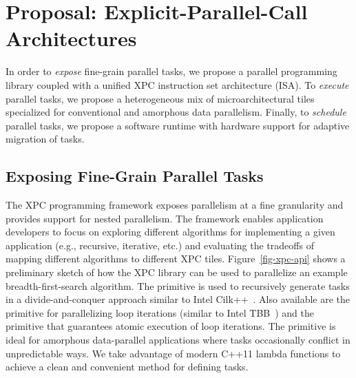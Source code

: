 
\section{Proposal: Explicit-Parallel-Call Architectures}
\label{sec-xpc}

In order to \emph{expose} fine-grain parallel tasks, we propose a
parallel programming library coupled with a unified XPC instruction set
architecture (ISA). To \emph{execute} parallel tasks, we propose a
heterogeneous mix of microarchitectural tiles specialized for
conventional and amorphous data parallelism. Finally, to \emph{schedule}
parallel tasks, we propose a software runtime with hardware support for
adaptive migration of tasks.

\subsection{Exposing Fine-Grain Parallel Tasks}


The XPC programming framework exposes parallelism at a fine granularity
and provides support for nested parallelism. The framework enables
application developers to focus on exploring different algorithms for
implementing a given application (e.g., recursive, iterative, etc.) and
evaluating the tradeoffs of mapping different algorithms to different XPC
tiles. Figure~\ref{fig-xpc-api} shows a preliminary sketch of how the XPC
library can be used to parallelize an example breadth-first-search
algorithm. The  primitive is used to recursively generate tasks
in a divide-and-conquer approach similar to Intel
Cilk++~\cite{cilk-spec2010,frigo-cilk5-pldi1998}. Also available are the
 primitive for parallelizing loop iterations (similar
to Intel TBB~\cite{reinders-tbb-book2007}) and the 
primitive that guarantees atomic execution of loop iterations. The
 primitive is ideal for amorphous data-parallel
applications where tasks occasionally conflict in unpredictable ways. We
take advantage of modern C++11 lambda functions to achieve a clean and
convenient method for defining tasks.

